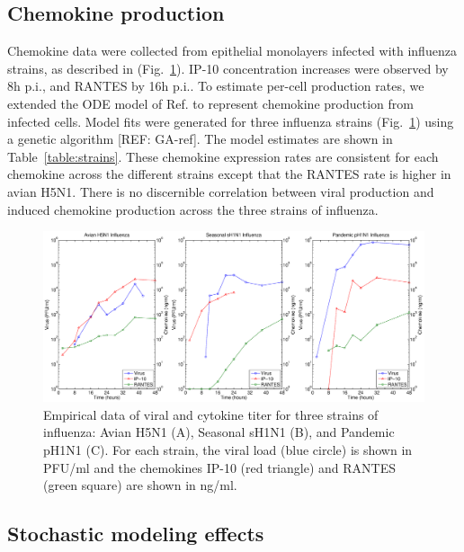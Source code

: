 \documentclass[10pt]{article}
\begin{document}
\subsection*{Chemokine production}

Chemokine data were collected from epithelial monolayers infected with influenza strains, as described in \cite{Mitchell2011} (Fig.~\ref{fig:data}).  IP-10 concentration increases were observed by 8h p.i., and RANTES by 16h p.i..  To estimate per-cell production rates, we extended the ODE model of Ref. \cite{Mitchell2011} to represent chemokine production from infected cells.  Model fits were generated for three influenza strains (Fig.~\ref{fig:data}) using a genetic algorithm [REF: GA-ref].  The model estimates are shown in Table~\ref{table:strains}.  These chemokine expression rates are consistent for each chemokine across the different strains except that the RANTES rate is higher in avian H5N1.  There is no discernible correlation between viral production and induced chemokine production across the three strains of influenza.

\begin{figure}[ht!]
\begin{center}
 \includegraphics[width=\textwidth]{data}
 \end{center}
\caption{Empirical data of viral and cytokine titer for three strains of influenza: Avian H5N1 (A), Seasonal sH1N1 (B), and Pandemic pH1N1 (C).  For each strain, the viral load (blue circle) is shown in PFU/ml and the chemokines IP-10 (red triangle) and RANTES (green square) are shown in ng/ml.} 
 \label{fig:data}
\end{figure}

\subsection*{Stochastic modeling effects}

\end{document}
